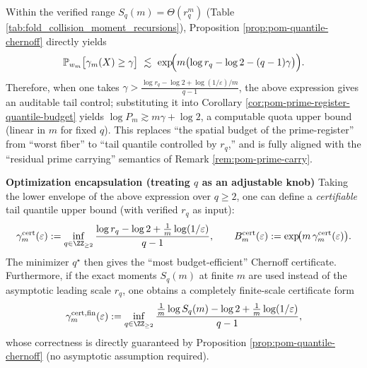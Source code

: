 
\begin{remark}\label{rem:pom-quantile-budget-computable}
Within the verified range \(S_q(m)=\Theta(r_q^m)\) (Table \ref{tab:fold_collision_moment_recursions}), Proposition \ref{prop:pom-quantile-chernoff} directly yields
$$
\mathbb{P}_{w_m}\big[\gamma_m(X)\ge\gamma\big]\ \lesssim\
\exp\!\Bigl(m\bigl(\log r_q-\log 2-(q-1)\gamma\bigr)\Bigr).
$$
Therefore, when one takes
\(
\gamma>\frac{\log r_q-\log 2+\log(1/\varepsilon)/m}{q-1}
\),
the above expression gives an auditable tail control; substituting it into Corollary \ref{cor:pom-prime-register-quantile-budget} yields
\(
\log P_m
\gtrsim
m\gamma+\log 2
\),
a computable quota upper bound (linear in \(m\) for fixed \(q\)).
This replaces ``the spatial budget of the prime-register'' from ``worst fiber'' to ``tail quantile controlled by \(r_q\),'' and is fully aligned with the ``residual prime carrying'' semantics of Remark \ref{rem:pom-prime-carry}.

\medskip\noindent\textbf{Optimization encapsulation (treating \(q\) as an adjustable knob)}
Taking the lower envelope of the above expression over \(q\ge 2\), one can define a \emph{certifiable} tail quantile upper bound (with verified \(r_q\) as input):
\[
\gamma^{\mathrm{cert}}_m(\varepsilon)
:=\inf_{q\in\ZZ_{\ge 2}}
\frac{\log r_q-\log 2+\frac{1}{m}\log(1/\varepsilon)}{q-1},
\qquad
B^{\mathrm{cert}}_m(\varepsilon):=\exp\!\bigl(m\,\gamma^{\mathrm{cert}}_m(\varepsilon)\bigr).
\]
The minimizer \(q^\star\) then gives the ``most budget-efficient'' Chernoff certificate.
Furthermore, if the exact moments \(S_q(m)\) at finite \(m\) are used instead of the asymptotic leading scale \(r_q\), one obtains a completely finite-scale certificate form
\[
\gamma^{\mathrm{cert,fin}}_m(\varepsilon)
:=\inf_{q\in\ZZ_{\ge 2}}
\frac{\frac{1}{m}\log S_q(m)-\log 2+\frac{1}{m}\log(1/\varepsilon)}{q-1},
\]
whose correctness is directly guaranteed by Proposition \ref{prop:pom-quantile-chernoff} (no asymptotic assumption required).


\end{remark}
